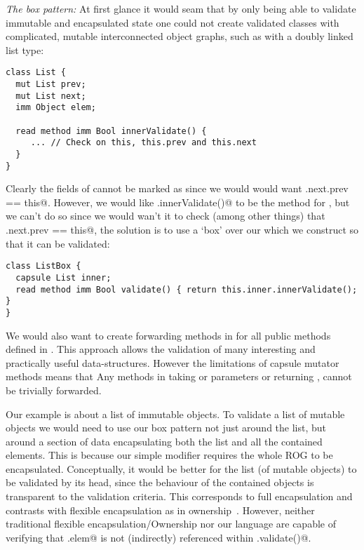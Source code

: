 \loseSpace
\noindent\textit{The box pattern:}
At first glance it would seam that by only being able to validate immutable and encapsulated state one could not create validated classes with complicated, mutable interconnected object graphs, such as with a doubly linked list type:
\begin{lstlisting}[escapechar=\%]
class List {
  mut List prev;
  mut List next;
  imm Object elem;
  
  read method imm Bool innerValidate() {
     ... // Check on this, this.prev and this.next
  }
}
\end{lstlisting}
Clearly the \Q@mut@ fields of \Q@List@ cannot be marked as \Q@capsule@ since we would would want \Q@this.next.prev == this@.
However, we would like \Q@.innerValidate()@ to be the \Q@validate@ method for \Q@list@, but we can’t do so since we would wan’t it to check (among other things) that \Q@this.next.prev == this@, the solution is to use a `box' over our \Q@List@ which we construct so that it can be validated:

\begin{lstlisting}[escapechar=\%]
class ListBox { 
  capsule List inner;
  read method imm Bool validate() { return this.inner.innerValidate(); }
}
\end{lstlisting}
We would also want to create forwarding methods in \Q@ListBox@ for all public methods defined in \Q@List@. This approach allows the validation of many interesting and practically useful data-structures.
However the limitations of capsule mutator methods means that 
Any \Q@mut@ methods in \Q@ListBox@ taking \Q@read@ or \Q@mut@ parameters or returning \Q@mut@, cannot be trivially forwarded.

Our example is about a list of immutable objects.
To validate a list of mutable objects we would need to use our box pattern not just around the list,
but around a section of data encapsulating both the list and all the contained elements.
This is because our simple \Q@capsule@ modifier requires the whole ROG to be encapsulated.
Conceptually, it would be better for the list (of mutable objects) to be validated by its
head, since the behaviour of the contained objects is transparent to the validation criteria. 
This corresponds to full encapsulation and contrasts with flexible encapsulation as in 
ownership~\cite{ClarkeEtAl98}. However, neither traditional flexible encapsulation/Ownership nor our language are capable of verifying that \Q@List.elem@ is not (indirectly) referenced within \Q@ListBox.validate()@.

